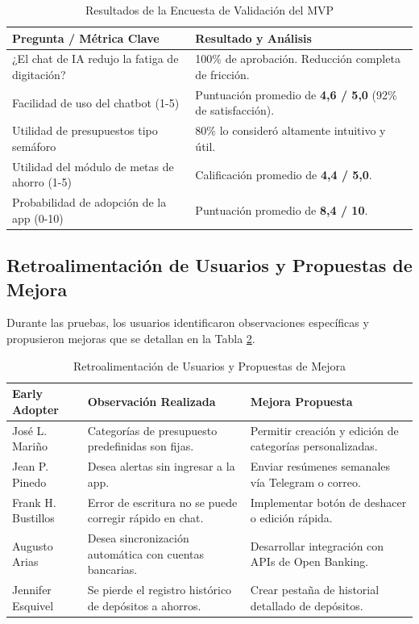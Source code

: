 \documentclass[12pt]{article}
\begin{document}
\begin{table}[H]
\centering
\caption{Resultados de la Encuesta de Validación del MVP}
\label{tab:resultados_validacion}
\begin{tabular}{p{7.5cm}p{7.5cm}}
\toprule
\textbf{Pregunta / Métrica Clave} & \textbf{Resultado y Análisis} \\
\midrule
¿El chat de IA redujo la fatiga de digitación? & 100\% de aprobación. Reducción completa de fricción. \\
Facilidad de uso del chatbot (1-5) & Puntuación promedio de \textbf{4,6 / 5,0} (92\% de satisfacción). \\
Utilidad de presupuestos tipo semáforo & 80\% lo consideró altamente intuitivo y útil. \\
Utilidad del módulo de metas de ahorro (1-5) & Calificación promedio de \textbf{4,4 / 5,0}. \\
Probabilidad de adopción de la app (0-10) & Puntuación promedio de \textbf{8,4 / 10}. \\
\bottomrule
\end{tabular}
\end{table}

\subsection{Retroalimentación de Usuarios y Propuestas de Mejora}
Durante las pruebas, los usuarios identificaron observaciones específicas y propusieron mejoras que se detallan en la Tabla \ref{tab:retroalimentacion_mejoras}.

\begin{table}[H]
\centering
\singlespacing
\caption{Retroalimentación de Usuarios y Propuestas de Mejora}
\label{tab:retroalimentacion_mejoras}
\begin{tabular}{p{3.5cm}p{5.8cm}p{5.9cm}}
\toprule
\textbf{Early Adopter} & \textbf{Observación Realizada} & \textbf{Mejora Propuesta} \\
\midrule
José L. Mariño & Categorías de presupuesto predefinidas son fijas. & Permitir creación y edición de categorías personalizadas. \\
Jean P. Pinedo & Desea alertas sin ingresar a la app. & Enviar resúmenes semanales vía Telegram o correo. \\
Frank H. Bustillos & Error de escritura no se puede corregir rápido en chat. & Implementar botón de deshacer o edición rápida. \\
Augusto Arias & Desea sincronización automática con cuentas bancarias. & Desarrollar integración con APIs de Open Banking. \\
Jennifer Esquivel & Se pierde el registro histórico de depósitos a ahorros. & Crear pestaña de historial detallado de depósitos. \\
\bottomrule
\end{tabular}
\end{table}
\end{document}
